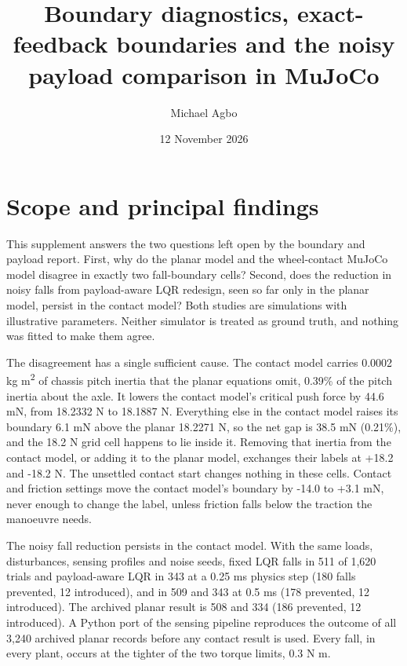 \documentclass[11pt,a4paper]{article}
\title{Boundary diagnostics, exact-feedback boundaries and the noisy payload comparison in MuJoCo}
\author{Michael Agbo}
\date{12 November 2026}
\begin{document}
\maketitle
\section*{Scope and principal findings}
This supplement answers the two questions left open by the boundary and payload report. First, why do the planar model and the wheel-contact MuJoCo model disagree in exactly two fall-boundary cells? Second, does the reduction in noisy falls from payload-aware LQR redesign, seen so far only in the planar model, persist in the contact model? Both studies are simulations with illustrative parameters. Neither simulator is treated as ground truth, and nothing was fitted to make them agree.

The disagreement has a single sufficient cause. The contact model carries 0.0002 kg m\textsuperscript{2} of chassis pitch inertia that the planar equations omit, 0.39\% of the pitch inertia about the axle. It lowers the contact model's critical push force by 44.6 mN, from 18.2332 N to 18.1887 N. Everything else in the contact model raises its boundary 6.1 mN above the planar 18.2271 N, so the net gap is 38.5 mN (0.21\%), and the 18.2 N grid cell happens to lie inside it. Removing that inertia from the contact model, or adding it to the planar model, exchanges their labels at +18.2 and -18.2 N. The unsettled contact start changes nothing in these cells. Contact and friction settings move the contact model's boundary by -14.0 to +3.1 mN, never enough to change the label, unless friction falls below the traction the manoeuvre needs.

The noisy fall reduction persists in the contact model. With the same loads, disturbances, sensing profiles and noise seeds, fixed LQR falls in 511 of 1,620 trials and payload-aware LQR in 343 at a 0.25 ms physics step (180 falls prevented, 12 introduced), and in 509 and 343 at 0.5 ms (178 prevented, 12 introduced). The archived planar result is 508 and 334 (186 prevented, 12 introduced). A Python port of the sensing pipeline reproduces the outcome of all 3,240 archived planar records before any contact result is used. Every fall, in every plant, occurs at the tighter of the two torque limits, 0.3 N m.
\end{document}
